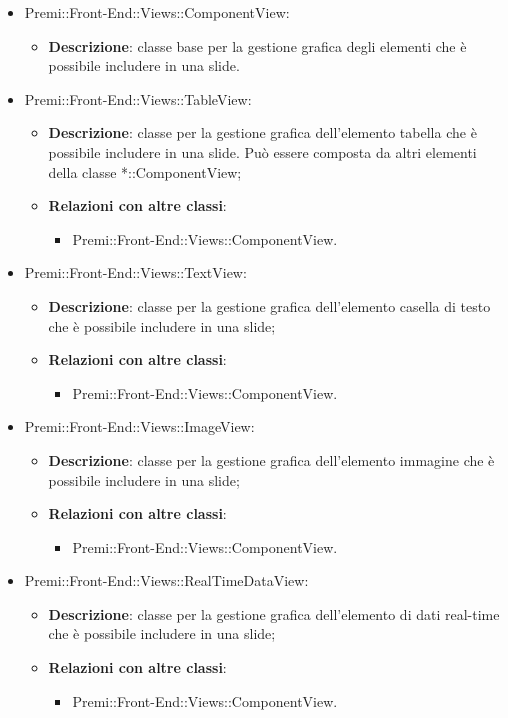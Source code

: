 \begin{itemize}
		\item Premi::Front-End::Views::ComponentView:
		\begin{itemize}
			\item \textbf{Descrizione}: classe base per la gestione grafica degli elementi che è possibile includere in una slide.
		\end{itemize}
		
		\item Premi::Front-End::Views::TableView:
		\begin{itemize}
			\item \textbf{Descrizione}: classe per la gestione grafica dell'elemento tabella che è possibile includere in una slide. Può essere composta da altri elementi della classe *::ComponentView;
			\item \textbf{Relazioni con altre classi}:
			\begin{itemize}
				\item Premi::Front-End::Views::ComponentView.
			\end{itemize}
		\end{itemize}
		
		
		\item Premi::Front-End::Views::TextView:
		\begin{itemize}
			\item \textbf{Descrizione}: classe per la gestione grafica dell'elemento casella di testo che è possibile includere in una slide;
			\item \textbf{Relazioni con altre classi}:
			\begin{itemize}
				\item Premi::Front-End::Views::ComponentView.
			\end{itemize}
		\end{itemize}
		
		\item Premi::Front-End::Views::ImageView:
		\begin{itemize}
			\item \textbf{Descrizione}: classe per la gestione grafica dell'elemento immagine che è possibile includere in una slide;
			\item \textbf{Relazioni con altre classi}:
			\begin{itemize}
				\item Premi::Front-End::Views::ComponentView.
			\end{itemize}
		\end{itemize}
		
		\item Premi::Front-End::Views::RealTimeDataView:
		\begin{itemize}
			\item \textbf{Descrizione}: classe per la gestione grafica dell'elemento di dati real-time che è possibile includere in una slide;
			\item \textbf{Relazioni con altre classi}:
			\begin{itemize}
				\item Premi::Front-End::Views::ComponentView.
			\end{itemize}
		\end{itemize}
		

\end{itemize}
